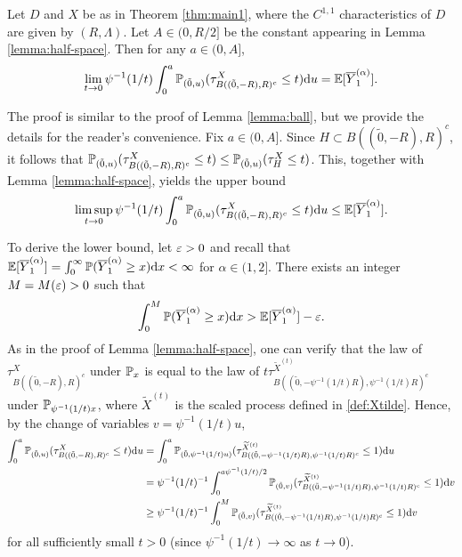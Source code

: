 \documentclass[11pt]{article}
\begin{document}
\begin{doublespace}
\begin{lemma}\label{lemma:outer ball}
Let $D$ and $X$ be as in Theorem \ref{thm:main1}, where the $C^{1,1}$ characteristics of $D$ are given by $(R,\Lambda)$. 
Let $A\in(0,R/2]$ be the constant appearing in Lemma \ref{lemma:half-space}.
Then for any $a\in(0, A ]$,
\[
\lim_{t\to 0}\psi^{-1}(1/t)\int_{0}^{a}\P_{(\tilde{0},u)}(\tau^{X}_{B((\tilde{0},-R),R)^{c}}\leq t)\ud u=\E[\overline{Y}^{(\alpha)}_{1}].
\]
\end{lemma}
\pf
The proof is similar to the proof of Lemma \ref{lemma:ball}, but we provide the details for the reader's convenience. 
Fix $a\in (0,A]$.
Since $H\subset B((\tilde{0},-R),R)^{c}$, it follows that $\P_{(\tilde{0},u)}(\tau^{X}_{B((\tilde{0},-R),R)^{c}}\le t)\leq \P_{(\tilde{0},u)}(\tau_{H}^{X}\le t)$. This, together with Lemma \ref{lemma:half-space}, yields the upper bound
\[
\limsup_{t\to 0}\psi^{-1}(1/t)\int_{0}^{a}\P_{(\tilde{0},u)}(\tau^{X}_{B((\tilde{0},-R),R)^c}\leq t)\ud u\leq \E[\overline{Y}^{(\alpha)}_{1}].
\]

To derive the lower bound, let $\eps>0$ and recall that $\E[\overline{Y}_{1}^{(\alpha)}]=\int_{0}^{\infty}\P(\overline{Y}_{1}^{(\alpha)}\geq x)\ud x<\infty$ for $\alpha\in (1,2]$. There exists an integer $M=M(\eps)>0$ such that
\begin{align}\label{eqn:ex ball lb3}
\int_{0}^{M}\P(\overline{Y}_{1}^{(\alpha)}\geq x)\ud x>\E[\overline{Y}_{1}^{(\alpha)}]-\eps.
\end{align}
As in the proof of Lemma \ref{lemma:half-space}, one can verify that the law of $\tau_{B((\tilde{0},-R),R)^{c}}^{X}$ under $\P_{x}$ is equal to the law of $t\tau_{B((\tilde{0},-\psi^{-1}(1/t)R),\psi^{-1}(1/t)R)^{c}}^{\widetilde{X}^{(t)}}$ under $\P_{\psi^{-1}(1/t)x}$, where $\widetilde{X}^{(t)}$ is the scaled process defined in \eqref{def:Xtilde}.
Hence, by the change of variables $v=\psi^{-1}(1/t)u$,  
\begin{align}\label{eqn:ex ball lb1}
\int_{0}^{a}\P_{(\tilde{0},u)}(\tau^{X}_{B((\tilde{0},-R),R)^{c}}\leq t)\ud u\nn
&=\int_{0}^{a}\P_{(\tilde{0},\psi^{-1}(1/t)u)}(\tau_{B((\tilde{0},-\psi^{-1}(1/t)R),\psi^{-1}(1/t)R)^{c}}^{\widetilde{X}^{(t)}} \leq 1)\ud u\nn\\
&=\psi^{-1}(1/t)^{-1}\int_{0}^{a\psi^{-1}(1/t)/2}\P_{(\tilde{0},v)}(\tau_{B((\tilde{0},-\psi^{-1}(1/t)R),\psi^{-1}(1/t)R)^{c}}^{\widetilde{X}^{(t)}} \leq 1)\ud v\nn\\
&\geq \psi^{-1}(1/t)^{-1}\int_{0}^{M}\P_{(\tilde{0},v)}(\tau_{B((\tilde{0},-\psi^{-1}(1/t)R),\psi^{-1}(1/t)R)^c}^{\widetilde{X}^{(t)}} \leq 1)\ud v
\end{align}
for all sufficiently small $t>0$ (since $\psi^{-1}(1/t)\to\infty$ as $t\to 0$). 


\end{doublespace}
\end{document}
